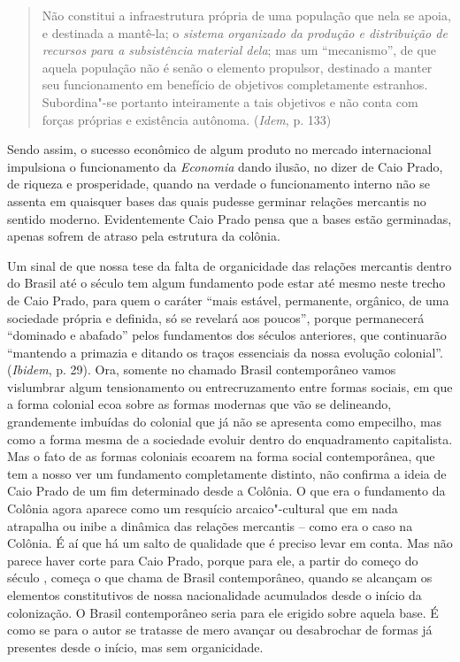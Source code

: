 \begin{quote}
Não constitui a infraestrutura própria de uma população que nela se
apoia, e destinada a mantê-la; o \emph{sistema organizado da produção e
distribuição de recursos para a subsistência material dela}; mas um
``mecanismo'', de que aquela população não é senão o elemento propulsor,
destinado a manter seu funcionamento em benefício de objetivos
completamente estranhos. Subordina"-se portanto inteiramente a tais
objetivos e não conta com forças próprias e existência autônoma.
(\emph{Idem}, p. 133)
\end{quote}

Sendo assim, o sucesso econômico de algum produto no mercado
internacional impulsiona o funcionamento da \emph{Economia} dando
ilusão, no dizer de Caio Prado, de riqueza e prosperidade, quando na
verdade o funcionamento interno não se assenta em quaisquer bases das
quais pudesse germinar relações mercantis no sentido moderno.
Evidentemente Caio Prado pensa que a bases estão
germinadas, apenas sofrem de atraso pela estrutura da colônia.

Um sinal de que nossa tese da falta de organicidade das relações
mercantis dentro do Brasil até o século  tem algum fundamento pode
estar até mesmo neste trecho de Caio Prado, para quem o caráter ``mais
estável, permanente, orgânico, de uma sociedade própria e definida, só
se revelará aos poucos'', porque permanecerá ``dominado e abafado''
pelos fundamentos dos séculos anteriores, que continuarão ``mantendo a
primazia e ditando os traços essenciais da nossa evolução colonial''.
(\emph{Ibidem}, p. 29). Ora, somente no chamado Brasil
contemporâneo vamos vislumbrar algum tensionamento ou
entrecruzamento entre formas sociais, em que a forma colonial ecoa sobre
as formas modernas que vão se delineando, grandemente imbuídas do
colonial que já não se apresenta como empecilho, mas como a forma mesma de
a sociedade evoluir dentro do enquadramento capitalista. Mas o fato de as
formas coloniais ecoarem na forma social contemporânea, que tem a nosso
ver um fundamento completamente distinto, não confirma a ideia de Caio
Prado de um fim determinado desde a Colônia. O que era o fundamento da
Colônia agora aparece como um resquício arcaico"-cultural que em nada atrapalha ou
inibe a dinâmica das relações mercantis -- como era o caso na Colônia. É
aí que há um salto de qualidade que é preciso levar em conta. Mas não
parece haver corte para Caio Prado, porque para ele, a partir do começo
do século , começa o que chama de Brasil contemporâneo, quando se
alcançam os elementos constitutivos de nossa nacionalidade acumulados
desde o início da colonização. O Brasil contemporâneo seria para ele
erigido sobre aquela base. É como se para o autor se tratasse de mero
avançar ou desabrochar de formas já presentes desde o início, mas sem
organicidade.

